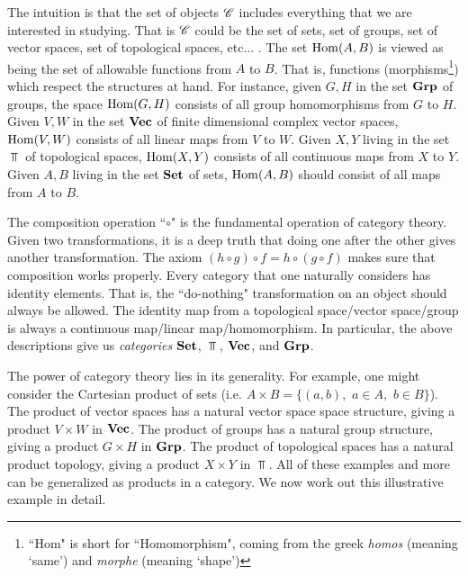 \documentclass{article}
\theoremstyle{definition}
\numberwithin{figure}{section}
\begin{document}
The intuition is that the set of objects $\mathscr{C}$ includes everything that we are interested in studying. That is $\mathscr{C}$ could be the set of sets, set of groups, set of vector spaces, set of topological spaces, etc... . The set $\mathrm{Hom}(A,B)$ is viewed as being the set of allowable functions from $A$ to $B$. That is, functions (morphisms\footnote{``Hom" is short for ``Homomorphism", coming from the greek \textit{homos} (meaning `same') and \textit{morphe} (meaning `shape')}) which respect the structures at hand. For instance, given $G,H$ in the set $\bold{Grp}$ of groups, the space $\mathrm{Hom}(G,H)$ consists of all group homomorphisms from $G$ to $H$. Given $V,W$ in the set $\bold{Vec}$ of finite dimensional complex vector spaces, $\mathrm{Hom}(V,W)$ consists of all linear maps from $V$ to $W$. Given $X,Y$ living in the set $\Top$ of topological spaces, $\mathrm{Hom}(X,Y)$ consists of all continuous maps from $X$ to $Y$. Given $A,B$ living in the set $\bold{Set}$ of sets, $\mathrm{Hom}(A,B)$ should consist of all maps from $A$ to $B$.

The composition operation ``$\circ$" is the fundamental operation of category theory. Given two transformations, it is a deep truth that doing one after the other gives another transformation. The axiom $(h\circ g)\circ f = h\circ (g\circ f)$ makes sure that composition works properly. Every category that one naturally considers has identity elements. That is, the ``do-nothing" transformation on an object should always be allowed. The identity map from a topological space/vector space/group is always a continuous map/linear map/homomorphism. In particular, the above descriptions give us \textit{categories} $\bold{Set}$, $\Top$, $\bold{Vec}$, and $\bold{Grp}$.

The power of category theory lies in its generality. For example, one might consider the Cartesian product of sets (i.e. $A\times B=\{(a,b),\,\, a\in A,\,\, b\in B\}$). The product of vector spaces has a natural vector space space structure, giving a product $V\times W$ in $\bold{Vec}$. The product of groups has a natural group structure, giving a product $G\times H$ in $\bold{Grp}$. The product of topological spaces has a natural product topology, giving a product $X\times Y$ in $\Top$. All of these examples and more can be generalized as products in a category. We now work out this illustrative example in detail.
\end{document}
